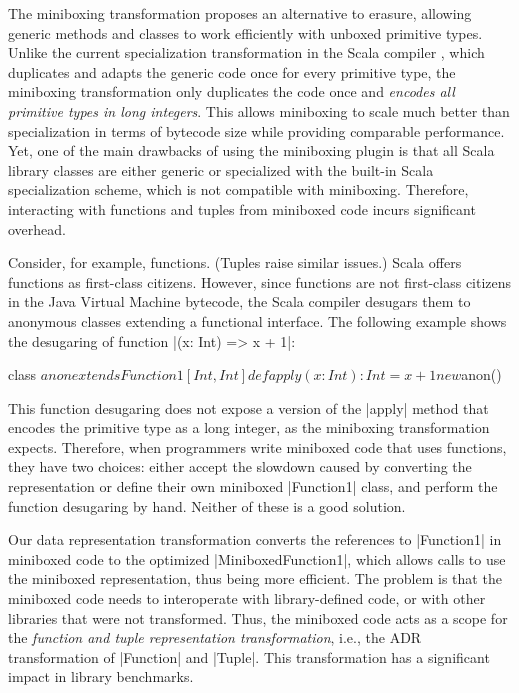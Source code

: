 The miniboxing transformation \cite{miniboxing} proposes an alternative to erasure, allowing generic methods and classes to work efficiently with unboxed primitive types. Unlike the current specialization transformation in the Scala compiler \cite{iuli-thesis}, which duplicates and adapts the generic code once for every primitive type, the miniboxing transformation only duplicates the code once and \emph{encodes all primitive types in long integers}. This allows miniboxing to scale much better than specialization \cite{miniboxing-linkedlist} in terms of bytecode size while providing comparable performance. Yet, one of the main drawbacks of using the miniboxing plugin is that all Scala library classes are either generic or specialized with the built-in Scala specialization scheme, which is not compatible with miniboxing. Therefore, interacting with functions and tuples from miniboxed code incurs significant overhead.

Consider, for example, functions. (Tuples raise similar issues.) Scala offers functions as first-class citizens. However, since functions are not first-class citizens in the Java Virtual Machine bytecode, the Scala compiler desugars them to anonymous classes extending a functional interface. The following example shows the desugaring of function |(x: Int) => x + 1|:

\begin{lstlisting-nobreak}
class $anon extends Function1[Int, Int] {
  def apply(x: Int): Int = x + 1
}
new $anon()
\end{lstlisting-nobreak}

This function desugaring does not expose a version of the |apply| method that encodes the primitive type as a long integer, as the miniboxing transformation expects. Therefore, when programmers write miniboxed code that uses functions, they have two choices: either accept the slowdown caused by converting the representation or define their own miniboxed |Function1| class, and perform the function desugaring by hand. Neither of these is a good solution.

Our data representation transformation converts the references to |Function1| in miniboxed code to the optimized |MiniboxedFunction1|, which allows calls to use the miniboxed representation, thus being more efficient. The problem is that the miniboxed code needs to interoperate with library-defined code, or with other libraries that were not transformed. Thus, the miniboxed code acts as a scope for the \emph{function and tuple representation transformation}, i.e., the ADR transformation of |Function| and |Tuple|. This transformation has a significant impact in library benchmarks.

